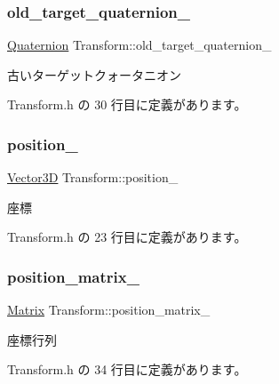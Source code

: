 \subsubsection{\texorpdfstring{old\+\_\+target\+\_\+quaternion\+\_\+}{old\_target\_quaternion\_}}
{\footnotesize\ttfamily \mbox{\hyperlink{_vector3_d_8h_a3ee38c9c46d9851e33a9a1113328dafc}{Quaternion}} Transform\+::old\+\_\+target\+\_\+quaternion\+\_\+\hspace{0.3cm}{\ttfamily [private]}}



古いターゲットクォータニオン 



 Transform.\+h の 30 行目に定義があります。

\mbox{\label{class_transform_aa36f8a9ae39411699f7ff77f017f618a}} 
\subsubsection{\texorpdfstring{position\+\_\+}{position\_}}
{\footnotesize\ttfamily \mbox{\hyperlink{class_vector3_d}{Vector3D}} Transform\+::position\+\_\+\hspace{0.3cm}{\ttfamily [private]}}



座標 



 Transform.\+h の 23 行目に定義があります。

\mbox{\label{class_transform_a52dc8d953e340e21ecd0a56fb5cb5a09}} 
\subsubsection{\texorpdfstring{position\+\_\+matrix\+\_\+}{position\_matrix\_}}
{\footnotesize\ttfamily \mbox{\hyperlink{class_matrix}{Matrix}} Transform\+::position\+\_\+matrix\+\_\+\hspace{0.3cm}{\ttfamily [private]}}



座標行列 



 Transform.\+h の 34 行目に定義があります。

